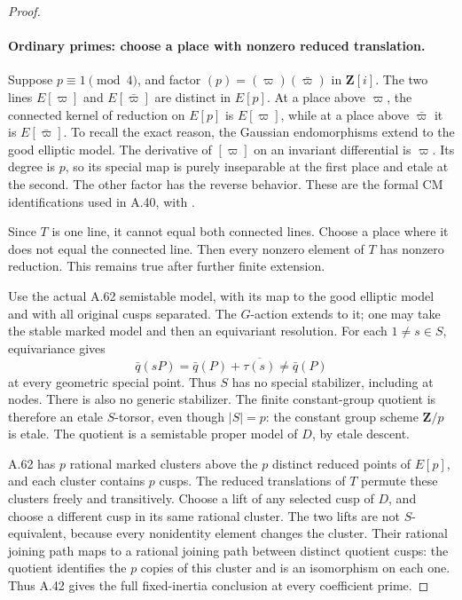 \begin{proof}
\paragraph{Ordinary primes: choose a place with nonzero reduced translation.}
Suppose \(p\equiv1\pmod4\), and factor
\((p)=(\varpi)(\bar\varpi)\) in
\(\mathbf Z[i]\). The two lines
\(E[\varpi]\) and \(E[\bar\varpi]\)
are distinct in \(E[p]\). At a place above
\(\varpi\), the connected kernel of reduction
on \(E[p]\) is \(E[\varpi]\), while at a
place above \(\bar\varpi\) it is
\(E[\bar\varpi]\). To recall the exact
reason, the Gaussian endomorphisms extend to
the good elliptic model. The derivative of
\([\varpi]\) on an invariant differential is
\(\varpi\). Its degree is \(p\), so its
special map is purely inseparable at the first
place and etale at the second. The other factor
has the reverse behavior. These are the formal
CM identifications used in A.40, with
\cite[Theorem III.6.2 and Theorem V.3.1]{fghSilvermanAEC}.

Since \(T\) is one line, it cannot equal both
connected lines. Choose a place where it does
not equal the connected line. Then every
nonzero element of \(T\) has nonzero reduction.
This remains true after further finite extension.

Use the actual A.62 semistable model, with its
map to the good elliptic model and with all
original cusps separated. The \(G\)-action
extends to it; one may take the stable marked
model and then an equivariant resolution. For
each \(1\ne s\in S\), equivariance gives
\[
       \bar q(sP)=\bar q(P)+\overline{\tau(s)}
                         \ne\bar q(P)                \tag{A.65.4}
\]
at every geometric special point. Thus \(S\)
has no special stabilizer, including at nodes.
There is also no generic stabilizer. The finite
constant-group quotient is therefore an etale
\(S\)-torsor, even though \(|S|=p\): the
constant group scheme \(\mathbf Z/p\) is etale.
The quotient is a semistable proper model of
\(D\), by etale descent.

A.62 has \(p\) rational marked clusters above
the \(p\) distinct reduced points of \(E[p]\),
and each cluster contains \(p\) cusps. The
reduced translations of \(T\) permute these
clusters freely and transitively. Choose a lift
of any selected cusp of \(D\), and choose a
different cusp in its same rational cluster.
The two lifts are not \(S\)-equivalent, because
every nonidentity element changes the cluster.
Their rational joining path maps to a rational
joining path between distinct quotient cusps:
the quotient identifies the \(p\) copies of
this cluster and is an isomorphism on each one.
Thus A.42 gives the full fixed-inertia conclusion
at every coefficient prime.


\end{proof}

